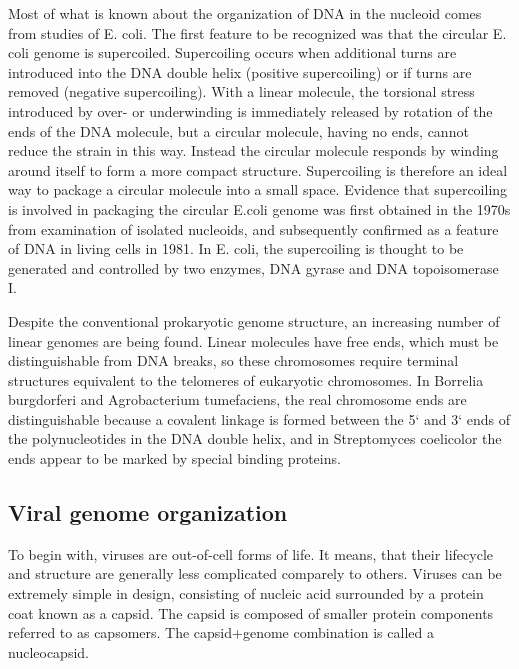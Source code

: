 Most of what is known about the organization of DNA in the nucleoid comes from studies of E. coli. 
The first feature to be recognized was that the circular E. coli genome is supercoiled. 
Supercoiling occurs when additional turns are introduced into the DNA double helix (positive supercoiling) or if turns are removed (negative supercoiling). 
With a linear molecule, the torsional stress introduced by over- or underwinding is immediately released by rotation of the ends of the DNA molecule, but a circular molecule, having no ends, cannot reduce the strain in this way. 
Instead the circular molecule responds by winding around itself to form a more compact structure. 
Supercoiling is therefore an ideal way to package a circular molecule into a small space. 
Evidence that supercoiling is involved in packaging the circular E.coli genome was first obtained in the 1970s from examination of isolated nucleoids, and subsequently confirmed as a feature of DNA in living cells in 1981. 
In E. coli, the supercoiling is thought to be generated and controlled by two enzymes, DNA gyrase and DNA topoisomerase I.

Despite the conventional prokaryotic genome structure, an increasing number of linear genomes are being found. 
Linear molecules have free ends, which must be distinguishable from DNA breaks, so these chromosomes require terminal structures equivalent to the telomeres 
of eukaryotic chromosomes. In Borrelia burgdorferi and Agrobacterium tumefaciens, the real chromosome ends are distinguishable because a covalent linkage is formed 
between the 5` and 3` ends of the polynucleotides in the DNA double helix, and in Streptomyces coelicolor the ends appear to be marked by special binding proteins.

\subsection{Viral genome organization}

To begin with, viruses are out-of-cell forms of life. It means, that their lifecycle and structure are generally less complicated comparely to others.
Viruses can be extremely simple in design, consisting of nucleic acid surrounded by a protein coat known as a capsid. The capsid is composed of smaller protein components referred to as capsomers. The capsid+genome combination is called a nucleocapsid.


